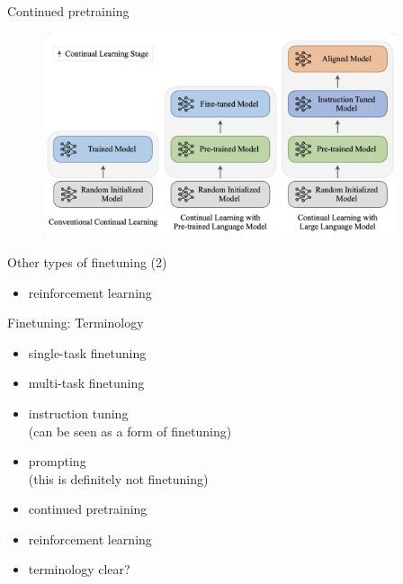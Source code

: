 \begin{frame}{Continued pretraining}

\vfill
	
	\begin{figure}
		\centering
		\includegraphics[height = 6cm]{figure/continuedpretraining2} 
	\end{figure}

\vfill

\end{frame}

\begin{frame}{Other types of finetuning (2)}

\vfill

\begin{itemize}
    \item reinforcement learning

\end{itemize}

\vfill

\end{frame}


\begin{frame}{Finetuning: Terminology}

\vfill

\begin{itemize}
\item single-task finetuning
\item multi-task finetuning
\item instruction tuning\\ (can be seen as a form of finetuning)
\item prompting\\
(this is definitely not finetuning)
\item continued pretraining
\item reinforcement learning
\item \ques terminology clear?
\end{itemize}

\vfill

\end{frame}



